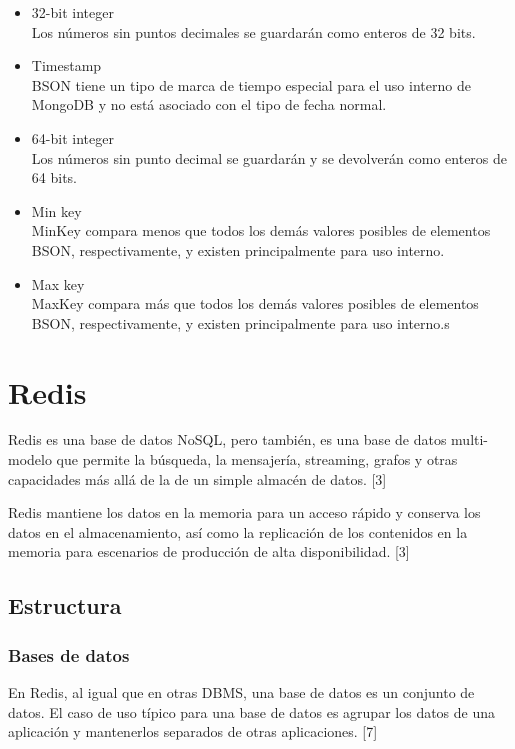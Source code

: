 \documentclass[twocolumn]{article}
\begin{document}
\begin{itemize}
  \item 32-bit integer
  \\Los números sin puntos decimales se guardarán como enteros de 32 bits.
  \item Timestamp
  \\BSON tiene un tipo de marca de tiempo especial para el uso interno de MongoDB y no está asociado con el tipo de fecha normal.
  \item 64-bit integer
  \\Los números sin punto decimal se guardarán y se devolverán como enteros de 64 bits.
  \item Min key
  \\MinKey compara menos que todos los demás valores posibles de elementos BSON, respectivamente, y existen principalmente para uso interno.
  \item Max key
  \\MaxKey compara más que todos los demás valores posibles de elementos BSON, respectivamente, y existen principalmente para uso interno.s
\end{itemize}

\section{Redis}

Redis es una base de datos NoSQL, pero también, es una base de datos multi-modelo que permite la búsqueda, la mensajería, streaming, grafos y otras capacidades más allá de la de un simple almacén de datos. [3]

Redis mantiene los datos en la memoria para un acceso rápido y conserva los datos en el almacenamiento, así como la replicación de los contenidos en la memoria para escenarios de producción de alta disponibilidad. [3]

\subsection{Estructura}

\subsubsection{Bases de datos}

En Redis, al igual que en otras DBMS, una base de datos es un conjunto de datos. El caso de uso típico para una base de datos es agrupar los datos de una aplicación y mantenerlos separados de otras aplicaciones. [7]
\end{document}
